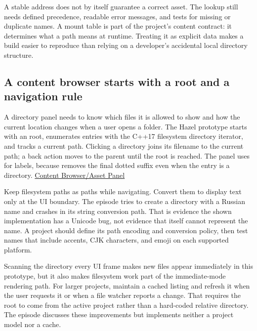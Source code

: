A stable address does not by itself guarantee a correct asset. The lookup still needs defined precedence, readable error messages, and tests for missing or duplicate names. A mount table is part of the project's content contract: it determines what a path means at runtime. Treating it as explicit data makes a build easier to reproduce than relying on a developer's accidental local directory structure.

\subsection{A content browser starts with a root and a navigation rule}\label{06-engine-ii-ch027-a-content-browser-starts-with-a-root-and-a-navigation-rule}

\hypertarget{06-engine-ii-ch027-a-content-browser-starts-with-a-root-and-a-navigation-rule}{}

A directory panel needs to know which files it is allowed to show and how the current location changes when a user opens a folder. The Hazel prototype starts with an  root, enumerates entries with the C++17 filesystem directory iterator, and tracks a current path. Clicking a directory joins its filename to the current path; a back action moves to the parent until the root is reached. The panel uses  for labels, because  removes the final dotted suffix even when the entry is a directory. \href{https://www.youtube.com/watch?v=aBuPmOGC7hU}{Content Browser/Asset Panel}

Keep filesystem paths as paths while navigating. Convert them to display text only at the UI boundary. The episode tries to create a directory with a Russian name and crashes in its string conversion path. That is evidence the shown implementation has a Unicode bug, not evidence that  itself cannot represent the name. A project should define its path encoding and conversion policy, then test names that include accents, CJK characters, and emoji on each supported platform.

Scanning the directory every UI frame makes new files appear immediately in this prototype, but it also makes filesystem work part of the immediate-mode rendering path. For larger projects, maintain a cached listing and refresh it when the user requests it or when a file watcher reports a change. That requires the root to come from the active project rather than a hard-coded relative directory. The episode discusses these improvements but implements neither a project model nor a cache.

